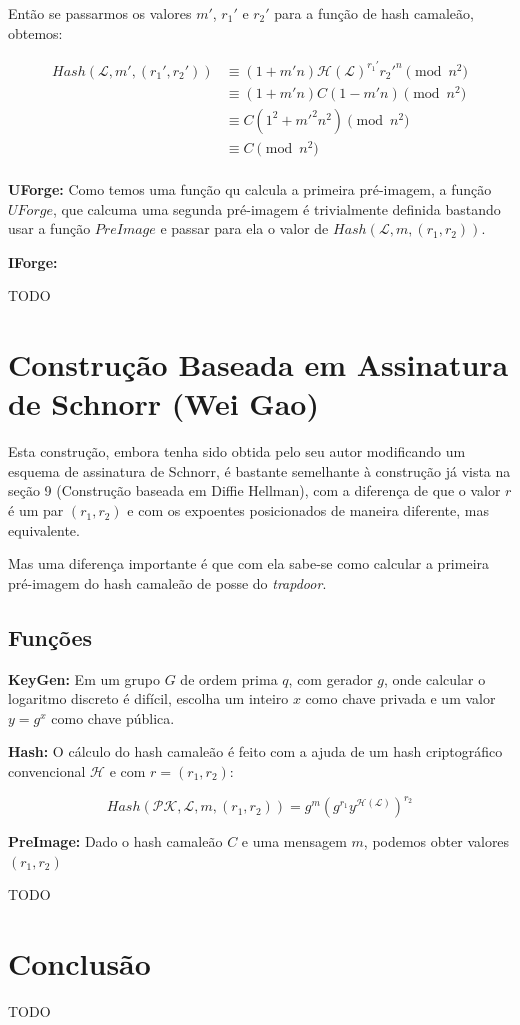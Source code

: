 \documentclass[a4paper]{article}
\begin{document}
Então se passarmos os valores $m'$, $r_1'$ e $r_2'$ para a função de
hash camaleão, obtemos:

\begin{equation}
\begin{split}
  Hash(\mathcal{L}, m', (r_1', r_2')) &\equiv (1+m'n)\mathcal{H}(\mathcal{L})^{r_1'}r_2'^n \pmod{n^2}\\
  &\equiv (1+m'n)C(1-m'n) \pmod{n^2}\\
  &\equiv C(1^2+m'^2n^2) \pmod{n^2}\\
  &\equiv C \pmod{n^2}\\
\end{split}
\end{equation}

\textbf{UForge:} Como temos uma função qu calcula a primeira
pré-imagem, a função $UForge$, que calcuma uma segunda pré-imagem é
trivialmente definida bastando usar a função $PreImage$ e passar
para ela o valor de $Hash(\mathcal{L}, m, (r_1, r_2))$.

\textbf{IForge: }

TODO

\section{Construção Baseada em Assinatura de Schnorr (Wei Gao) \cite{wei}}

Esta construção, embora tenha sido obtida pelo seu autor modificando
um esquema de assinatura de Schnorr, é bastante semelhante à
construção já vista na seção 9 (Construção baseada em Diffie Hellman),
com a diferença de que o valor $r$ é um par $(r_1, r_2)$ e com os
expoentes posicionados de maneira diferente, mas equivalente.

Mas uma diferença importante é que com ela sabe-se como calcular a
primeira pré-imagem do hash camaleão de posse do \textit{trapdoor}.

\subsection{Funções}

\textbf{KeyGen: } Em um grupo $G$ de ordem prima $q$, com gerador
$g$, onde calcular o logaritmo discreto é difícil, escolha um inteiro
$x$ como chave privada e um valor $y=g^x$ como chave pública.

\textbf{Hash: } O cálculo do hash camaleão é feito com a ajuda de um
hash criptográfico convencional $\mathcal{H}$ e com $r=(r_1, r_2)$:

$$
Hash(\mathcal{PK}, \mathcal{L}, m, (r_1, r_2)) =
g^m(g^{r_1}y^{\mathcal{H}(\mathcal{L})})^{r_2}
$$

\textbf{PreImage:} Dado o hash camaleão $C$ e uma mensagem $m$,
podemos obter valores $(r_1, r_2)$

TODO

\section{Conclusão}

TODO

{}
\end{document}
